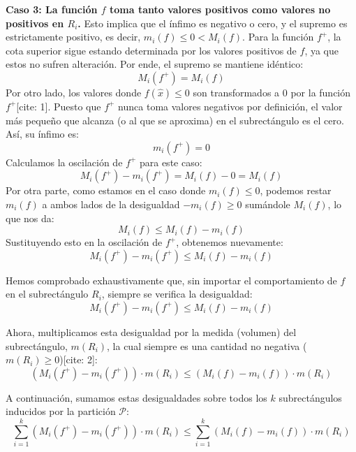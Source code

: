 \documentclass[11pt,letterpaper]{article}
\begin{document}
\textbf{Caso 3: La función $f$ toma tanto valores positivos como valores no positivos en $R_{i}$.}
Esto implica que el ínfimo es negativo o cero, y el supremo es estrictamente positivo, es decir, $m_{i}(f) \le 0 < M_{i}(f)$.
Para la función $f^{+}$, la cota superior sigue estando determinada por los valores positivos de $f$, ya que estos no sufren alteración. Por ende, el supremo se mantiene idéntico:
\begin{equation*}
M_{i}(f^{+}) = M_{i}(f)
\end{equation*}
Por otro lado, los valores donde $f(\hat{x}) \le 0$ son transformados a $0$ por la función $f^{+}$[cite: 1]. Puesto que $f^{+}$ nunca toma valores negativos por definición, el valor más pequeño que alcanza (o al que se aproxima) en el subrectángulo es el cero. Así, su ínfimo es:
\begin{equation*}
m_{i}(f^{+}) = 0
\end{equation*}
Calculamos la oscilación de $f^{+}$ para este caso:
\begin{equation*}
M_{i}(f^{+}) - m_{i}(f^{+}) = M_{i}(f) - 0 = M_{i}(f)
\end{equation*}
Por otra parte, como estamos en el caso donde $m_{i}(f) \le 0$, podemos restar $m_{i}(f)$ a ambos lados de la desigualdad $-m_{i}(f) \ge 0$ sumándole $M_{i}(f)$, lo que nos da:
\begin{equation*}
M_{i}(f) \le M_{i}(f) - m_{i}(f)
\end{equation*}
Sustituyendo esto en la oscilación de $f^{+}$, obtenemos nuevamente:
\begin{equation*}
M_{i}(f^{+}) - m_{i}(f^{+}) \le M_{i}(f) - m_{i}(f)
\end{equation*}

Hemos comprobado exhaustivamente que, sin importar el comportamiento de $f$ en el subrectángulo $R_{i}$, siempre se verifica la desigualdad:
\begin{equation*}
M_{i}(f^{+}) - m_{i}(f^{+}) \le M_{i}(f) - m_{i}(f)
\end{equation*}

Ahora, multiplicamos esta desigualdad por la medida (volumen) del subrectángulo, $m(R_{i})$, la cual siempre es una cantidad no negativa ($m(R_{i}) \ge 0$)[cite: 2]:
\begin{equation*}
(M_{i}(f^{+}) - m_{i}(f^{+})) \cdot m(R_{i}) \le (M_{i}(f) - m_{i}(f)) \cdot m(R_{i})
\end{equation*}

A continuación, sumamos estas desigualdades sobre todos los $k$ subrectángulos inducidos por la partición $\mathcal{P}$:
\begin{equation*}
\sum_{i=1}^{k} (M_{i}(f^{+}) - m_{i}(f^{+})) \cdot m(R_{i}) \le \sum_{i=1}^{k} (M_{i}(f) - m_{i}(f)) \cdot m(R_{i})
\end{equation*}
\end{document}

